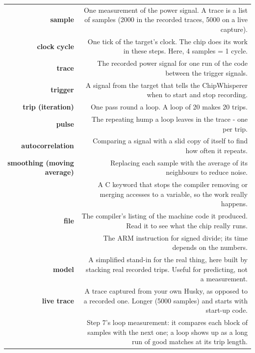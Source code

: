 \documentclass[11pt,letterpaper]{article}
\begin{document}
{\small{}
\begin{longtable}{|R{0.3188}|R{0.6812}|}
\hline
{} &  \\ \hline
\endhead
\textbf{sample} & One measurement of the power signal. A trace is a list of samples (2000 in the recorded traces, 5000 on a live capture). \\ \hline
\textbf{clock cycle} & One tick of the target's clock. The chip does its work in these steps. Here, 4 samples = 1 cycle. \\ \hline
\textbf{trace} & The recorded power signal for one run of the code between the trigger signals. \\ \hline
\textbf{trigger} & A signal from the target that tells the ChipWhisperer when to start and stop recording. \\ \hline
\textbf{trip (iteration)} & One pass round a loop. A loop of 20 makes 20 trips. \\ \hline
\textbf{pulse} & The repeating hump a loop leaves in the trace - one per trip. \\ \hline
\textbf{autocorrelation} & Comparing a signal with a slid copy of itself to find how often it repeats. \\ \hline
\textbf{smoothing (moving average)} & Replacing each sample with the average of its neighbours to reduce noise. \\ \hline
\textbf{} & A C keyword that stops the compiler removing or merging accesses to a variable, so the work really happens. \\ \hline
\textbf{ file} & The compiler's listing of the machine code it produced. Read it to see what the chip really runs. \\ \hline
\textbf{} & The ARM instruction for signed divide; its time depends on the numbers. \\ \hline
\textbf{model} & A simplified stand-in for the real thing, here built by stacking real recorded trips. Useful for predicting, not a measurement. \\ \hline
\textbf{live trace} & A trace captured from your own Husky, as opposed to a recorded one. Longer (5000 samples) and starts with start-up code. \\ \hline
\textbf{} & Step 7's loop measurement: it compares each block of  samples with the next one; a loop shows up as a long run of good matches at its trip length. \\ \hline
\end{longtable}}
\end{document}
